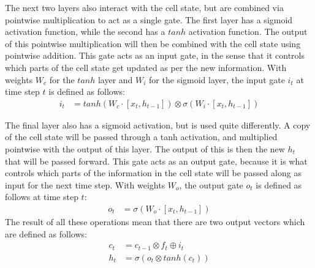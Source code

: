 \noindent
The next two layers also interact with the cell state, but are combined via pointwise multiplication to act as a single gate. The first layer has a sigmoid activation function, while the second has a $tanh$ activation function. The output of this pointwise multiplication will then be combined with the cell state using pointwise addition. This gate acts as an input gate, in the sense that it controls which parts of the cell state get updated as per the new information. With weights $W_c$ for the $tanh$ layer and $W_i$ for the sigmoid layer, the input gate $i_t$ at time step $t$ is defined as follows:
\begin{align}
    i_t &= tanh(W_c \cdot [x_t,h_{t-1}]) \otimes \sigma (W_i \cdot [x_t,h_{t-1}])
\end{align}

\noindent
The final layer also has a sigmoid activation, but is used quite differently. A copy of the cell state will be passed through a tanh activation, and multiplied pointwise with the output of this layer. The output of this is then the new $h_t$ that will be passed forward. This gate acts as an output gate, because it is what controls which parts of the information in the cell state will be passed along as input for the next time step.
With weights $W_o$, the output gate $o_t$ is defined as follows at time step $t$:
\begin{align}
    o_t &= \sigma(W_o \cdot [x_t,h_{t-1}])
\end{align}
The result of all these operations mean that there are two output vectors which are defined as follows:
\begin{align}
    c_t &= c_{t-1} \otimes f_t \oplus i_t \\
    h_t &= \sigma (o_t \otimes tanh (c_t))
\end{align}
